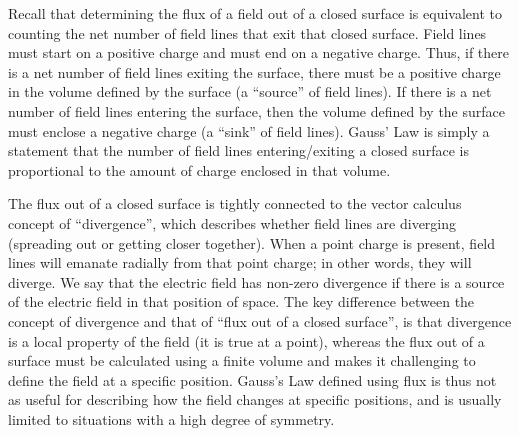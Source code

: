 Recall that determining the flux of a field out of a closed surface is equivalent to counting the net number of field lines that exit that closed surface. Field lines must start on a positive charge and must end on a negative charge. Thus, if there is a net number of field lines exiting the surface, there must be a positive charge in the volume defined by the surface (a ``source'' of field lines). If there is a net number of field lines entering the surface, then the volume defined by the surface must enclose a negative charge (a ``sink'' of field lines). Gauss' Law is simply a statement that the number of field lines entering/exiting a closed surface is proportional to the amount of charge enclosed in that volume.

The flux out of a closed surface is tightly connected to the vector calculus concept of ``divergence'', which describes whether field lines are diverging (spreading out or getting closer together). When a point charge is present, field lines will emanate radially from that point charge; in other words, they will diverge. We say that the electric field has non-zero divergence if there is a source of the electric field in that position of space. The key difference between the concept of divergence and that of ``flux out of a closed surface'', is that divergence is a local property of the field (it is true at a point), whereas the flux out of a surface must be calculated using a finite volume and makes it challenging to define the field at a specific position. Gauss's Law defined using flux is thus not as useful for describing how the field changes at specific positions, and is usually limited to situations with a high degree of symmetry.

